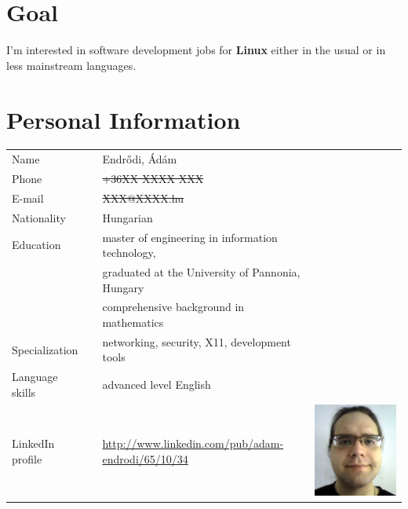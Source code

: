 \documentclass[a4paper,12pt]{article}
\newcommand\Yell{\textbf}
\begin{document}
\section{Goal}

I'm interested in software development jobs for \Yell{Linux} either in
the usual or in less mainstream languages.

\section{Personal Information}

\begin{tabularx}{\linewidth}{lXll}
Name			&& Endr\H{o}di, \'Ad\'am	&			\\
Phone			&& \sout{+36XX XXXX XXX}	&			\\
E-mail			&& \sout{XXX@XXXX.hu}		&			\\
Nationality		&& Hungarian			&			\\
Education		&& master of engineering in information technology, &	\\
			&& graduated at the University of Pannonia, Hungary &	\\
			&& comprehensive background in mathematics &		\\
Specialization		&& networking, security, X11, development tools &	\\
Language skills		&& advanced level English	&			\\
LinkedIn profile	&& \url{http://www.linkedin.com/pub/adam-endrodi/65/10/34}
			 & \includegraphics*[scale=0.2,viewport=0 0 400 1,clip=false]{me} \\
\end{tabularx}
\end{document}
